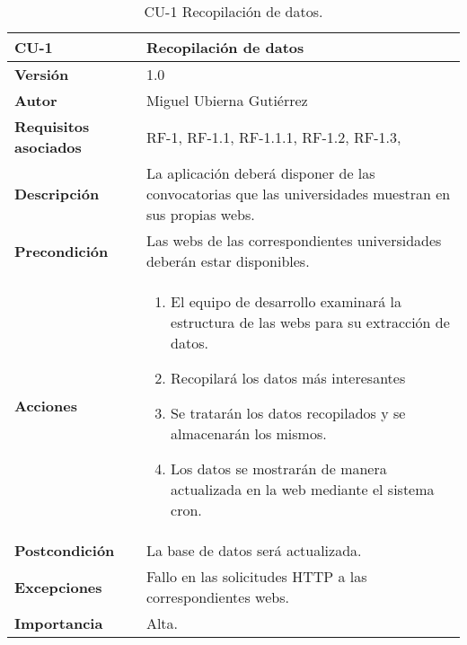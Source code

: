 \begin{table}[p]
	\centering
	\begin{tabularx}{\linewidth}{ p{} p{} }
		\toprule
		\textbf{CU-1}    & \textbf{Recopilación de datos}\\
		\toprule
		\textbf{Versión}              & 1.0    \\
		\textbf{Autor}                & Miguel Ubierna Gutiérrez \\
		\textbf{Requisitos asociados} & RF-1, RF-1.1, RF-1.1.1, RF-1.2, RF-1.3,  \\
		\textbf{Descripción}          & La aplicación deberá disponer de las convocatorias que las universidades muestran en sus propias webs. \\
		\textbf{Precondición}         & Las webs de las correspondientes universidades deberán estar disponibles. \\
		\textbf{Acciones}             &
		\begin{enumerate}
			\def\labelenumi{\arabic{enumi}.}
			\tightlist
			\item El equipo de desarrollo examinará la estructura de las webs para su extracción de datos.
			\item Recopilará los datos más interesantes
                \item Se tratarán los datos recopilados y se almacenarán los mismos.
                \item Los datos se mostrarán de manera actualizada en la web mediante el sistema cron.
		\end{enumerate}\\
		\textbf{Postcondición}        & La base de datos será actualizada. \\
		\textbf{Excepciones}          & Fallo en las solicitudes HTTP a las correspondientes webs. \\
		\textbf{Importancia}          & Alta. \\
		\bottomrule
	\end{tabularx}
	\caption{CU-1 Recopilación de datos.}
\end{table}



